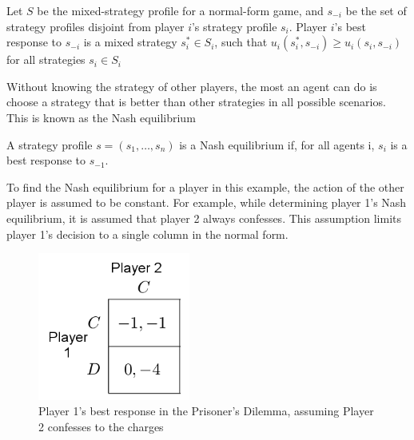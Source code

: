\begin{define}
  Let $S$ be the mixed-strategy profile for a normal-form game, and $s_{-i}$ be the set of strategy profiles disjoint from player $i$'s strategy profile $s_i$. Player $i$'s best response to $s_{-i}$ is a mixed strategy $s_i^*\in S_i$, such that $u_i(s_i^*,s_{-i}) \ge u_i(s_i, s_{-i})$ for all strategies $s_i\in S_i$
\end{define}

Without knowing the strategy of other players, the most an agent can do is choose a strategy that is better than other strategies in all possible scenarios. This is known as the Nash equilibrium

\begin{define}
  A strategy profile $s=(s_1,\dots ,s_n)$ is a Nash equilibrium if, for all agents i, $s_i$ is a best response to $s_{-1}$.
\end{define}

To find the Nash equilibrium for a player in this example, the action of the other player is assumed to be constant. For example, while determining player 1's Nash equilibrium, it is assumed that player 2 always confesses. This assumption limits player 1's decision to a single column in the normal form.
\begin{figure}[H]
  \centering
  \includegraphics[width=5cm]{figures/ExamplePartialGrid1.png}
  \caption{Player 1's best response in the Prisoner's Dilemma, assuming Player 2 confesses to the charges}
  \label{fig:NashCol1}
\end{figure}

